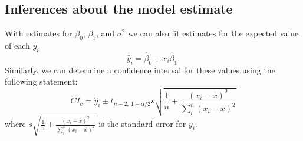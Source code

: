 \documentclass{article}
\begin{document}
\subsection{Inferences about the model estimate}
With estimates for \(\beta_0\), \(\beta_1\), and \(\sigma^2\) we can also fit estimates for
the expected value of each \(y_i\)
\begin{equation*}
    \hat{y}_i = \hat{\beta}_0 + x_i \hat{\beta}_1.
\end{equation*}
Similarly, we can determine a confidence interval for these values using the following statement:
\begin{equation*}
    CI_c = \hat{y}_i \pm t_{n-2,\: 1-\alpha/2} s \sqrt{\frac{1}{n} + \frac{\left( x_i - \overline{x} \right)^2}{\sum_i^n \left( x_i - \overline{x} \right)^2}}
\end{equation*}
where \(s\sqrt{\frac{1}{n} + \frac{\left( x_i - \overline{x} \right)^2}{\sum_i^n \left( x_i - \overline{x} \right)^2}}\) 
is the standard error for \(y_i\).
\end{document}
